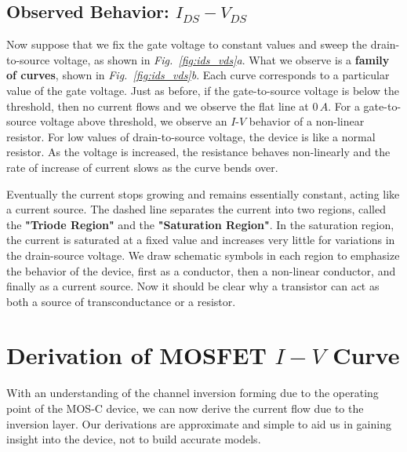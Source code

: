 \subsection{Observed Behavior: \texorpdfstring{$I_{DS} - V_{DS}$}{Drain Current vs. Drain Voltage}}
Now suppose that we fix the gate voltage to constant values and sweep the drain-to-source voltage, as shown in \emph{Fig.~\ref{fig:ids_vds}a}.  What we observe is a \textbf{family of curves}, shown in \emph{Fig.~\ref{fig:ids_vds}b}.  Each curve corresponds to a particular value of the gate voltage.  Just as before, if the gate-to-source voltage is below the threshold, then no current flows and we observe the flat line at $0\,A$. For a gate-to-source voltage above threshold, we observe an $I$-$V$ behavior of a non-linear resistor.  For low values of drain-to-source voltage, the device is like a normal resistor. As the voltage is increased, the resistance behaves non-linearly and the rate of increase of current slows as the curve bends over.

Eventually the current stops growing and remains essentially constant, acting like a current source.  The dashed line separates the current into two regions, called the \textbf{"Triode Region"} and the \textbf{"Saturation Region"}.  In the saturation region, the current is saturated at a fixed value and increases very little for variations in the drain-source voltage.  We draw schematic symbols in each region to emphasize the behavior of the device, first as a conductor, then a non-linear conductor, and finally as a current source.  Now it should be clear why a transistor can act as both a source of transconductance or a resistor.
\section{Derivation of MOSFET \texorpdfstring{$I-V$}{I-V} Curve}
With an understanding of the channel inversion forming due to the operating point of the MOS-C device, we can now derive the current flow due to the inversion layer.  Our derivations are approximate and simple to aid us in gaining insight into the device, not to build accurate models.
